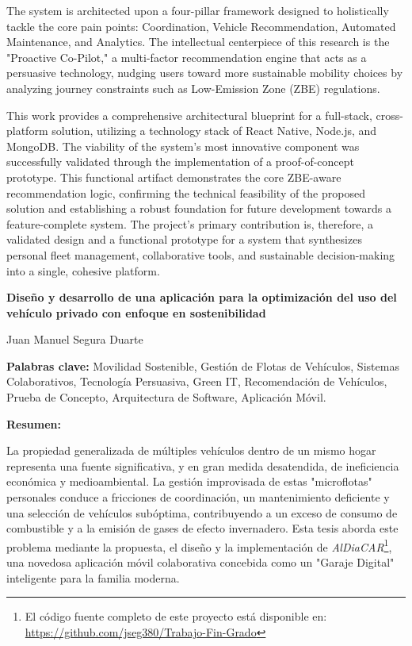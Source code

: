 \textgap

The system is architected upon a four-pillar framework designed to holistically tackle the core pain points: Coordination, Vehicle Recommendation, Automated Maintenance, and Analytics. The intellectual centerpiece of this research is the "Proactive Co-Pilot," a multi-factor recommendation engine that acts as a persuasive technology, nudging users toward more sustainable mobility choices by analyzing journey constraints such as Low-Emission Zone (ZBE) regulations.

\textgap

This work provides a comprehensive architectural blueprint for a full-stack, cross-platform solution, utilizing a technology stack of React Native, Node.js, and MongoDB. The viability of the system's most innovative component was successfully validated through the implementation of a proof-of-concept prototype. This functional artifact demonstrates the core ZBE-aware recommendation logic, confirming the technical feasibility of the proposed solution and establishing a robust foundation for future development towards a feature-complete system. The project's primary contribution is, therefore, a validated design and a functional prototype for a system that synthesizes personal fleet management, collaborative tools, and sustainable decision-making into a single, cohesive platform.


\newpage


\begin{center}
    {\large\bfseries Diseño y desarrollo de una aplicación para la optimización del uso del vehículo privado con enfoque en sostenibilidad}
\end{center}
\begin{center}
    Juan Manuel Segura Duarte
\end{center}

\begin{flushleft}
    \textbf{Palabras clave:} Movilidad Sostenible, Gestión de Flotas de Vehículos, Sistemas Colaborativos, Tecnología Persuasiva, Green IT, Recomendación de Vehículos, Prueba de Concepto, Arquitectura de Software, Aplicación Móvil.
\end{flushleft}

\begin{flushleft}
    \textbf{Resumen:}
\end{flushleft}

La propiedad generalizada de múltiples vehículos dentro de un mismo hogar representa una fuente significativa, y en gran medida desatendida, de ineficiencia económica y medioambiental. La gestión improvisada de estas "microflotas" personales conduce a fricciones de coordinación, un mantenimiento deficiente y una selección de vehículos subóptima, contribuyendo a un exceso de consumo de combustible y a la emisión de gases de efecto invernadero. Esta tesis aborda este problema mediante la propuesta, el diseño y la implementación de \textit{AlDiaCAR}\footnote{El código fuente completo de este proyecto está disponible en: \url{https://github.com/jseg380/Trabajo-Fin-Grado}}, una novedosa aplicación móvil colaborativa concebida como un "Garaje Digital" inteligente para la familia moderna.

